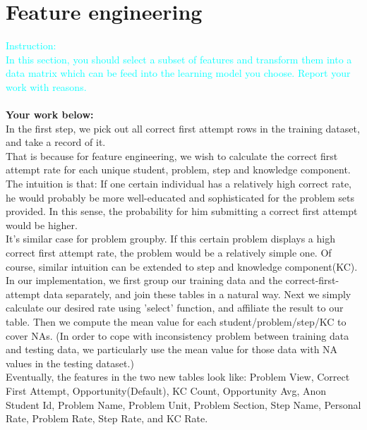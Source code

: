 \documentclass{article}
\begin{document}
\section{Feature engineering}
\textcolor{cyan}{Instruction: \\
In this section, you should select a subset of features and transform them into a data matrix which can be feed into the learning model you choose. Report your work with reasons.}\\\\
\textbf{Your work below:}\\
In the first step, we pick out all correct first attempt rows in the training dataset, and take a record of it.\\
That is because for feature engineering, we wish to calculate the correct first attempt rate for each unique student, problem, step and knowledge component.
The intuition is that: If one certain individual has a relatively high correct rate, he would probably be more well-educated and sophisticated for the problem sets provided.
In this sense, the probability for him submitting a correct first attempt would be higher.\\
It's similar case for problem groupby. If this certain problem displays a high correct first attempt rate, the problem would be a relatively simple one.
Of course, similar intuition can be extended to step and knowledge component(KC).\\
In our implementation, we first group our training data and the correct-first-attempt data separately, and join these tables in a natural way.
Next we simply calculate our desired rate using 'select' function, and affiliate the result to our table.
Then we compute the mean value for each student/problem/step/KC to cover NAs.
(In order to cope with inconsistency problem between training data and testing data, we particularly use the mean value for those data with NA values in the testing dataset.)\\
Eventually, the features in the two new tables look like:
Problem View, Correct First Attempt, Opportunity(Default), KC Count, Opportunity Avg, Anon Student Id, Problem Name, 
Problem Unit, Problem Section, Step Name, Personal Rate, Problem Rate, Step Rate, and KC Rate.
\end{document}
